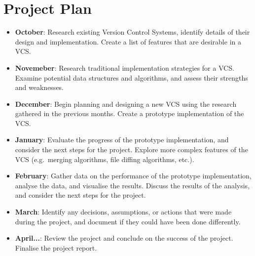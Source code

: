 \documentclass[a4paper,12pt]{article}
\begin{document}
\section*{Project Plan}
\begin{itemize}
    \item \textbf{October}: Research existing Version Control Systems, identify details of their design and implementation. Create a list of features that are desirable in a VCS\@.
    \item \textbf{Novemeber}: Research traditional implementation strategies for a VCS\@. Examine potential data structures and algorithms, and assess their strengths and weaknesses.
    \item \textbf{December}: Begin planning and designing a new VCS using the research gathered in the previous months. Create a prototype implementation of the VCS\@.
    \item \textbf{January}: Evaluate the progress of the prototype implementation, and consider the next steps for the project. Explore more complex features of the VCS (e.g.\ merging algorithms, file diffing algorithms, etc.).
    \item \textbf{February}: Gather data on the performance of the prototype implementation, analyse the data, and visualise the results. Discuss the results of the analysis, and consider the next steps for the project.
    \item \textbf{March}: Identify any decisions, assumptions, or actions that were made during the project, and document if they could have been done differently.
    \item \textbf{April...}: Review the project and conclude on the success of the project. Finalise the project report.
\end{itemize}



\end{document}
